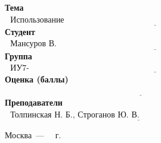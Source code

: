 \begin{titlepage}
	\noindent\textbf{Тема} $\underline{\text{~~Использование функционалов~~~~~~~~~~~~~~~~~~~~~~~~~~~~~~~~~~~~~~~~~~~~~~~~~~~~~~~~~~~~~~~~~~~~~~~}}$\newline\newline
	\noindent\textbf{Студент} $\underline{\text{~~Мансуров В. М.~~~~~~~~~~~~~~~~~~~~~~~~~~~~~~~~~~~~~~~~~~~~~~~~~~~~~~~~~~~~~~~~~~~~~~~~~~~~~~~~~~~~~~}}$\newline\newline
	\noindent\textbf{Группа} $\underline{\text{~~ИУ7-66Б~~~~~~~~~~~~~~~~~~~~~~~~~~~~~~~~~~~~~~~~~~~~~~~~~~~~~~~~~~~~~~~~~~~~~~~~~~~~~~~~~~~~~~~~~~~~~~~~~}}$\newline\newline
	\noindent\textbf{Оценка (баллы)} $\underline{\text{~~~~~~~~~~~~~~~~~~~~~~~~~~~~~~~~~~~~~~~~~~~~~~~~~~~~~~~~~~~~~~~~~~~~~~~~~~~~~~~~~~~~~~~~~~~~~~~~~~}}$\newline\newline
	\noindent\textbf{Преподаватели} $\underline{\text{~~Толпинская Н. Б., Строганов Ю. В.~~~~~~~~~~~~~~~~~~~~~~~~~~~~~~~~~~~~~~~~~~~~~~~~}}$\newline

	\begin{center}
		\vfill
		Москва~---~\the\year
		~г.
	\end{center}
	\restoregeometry
\end{titlepage}

